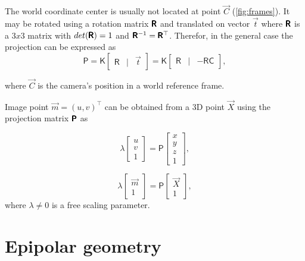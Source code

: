 The world coordinate center is usually not located at point $\vec{C}$ (\autoref{fig:frames}). 
It may be rotated using a rotation matrix $\pmb{\mathsf{R}}$ and translated on vector $\vec{t}$ where $\pmb{\mathsf{R}}$ is a $3x3$ matrix with $det(\pmb{\mathsf{R}}) = 1$ and $\pmb{\mathsf{R}}^{-1} = \pmb{\mathsf{R}}^\top$. 
Therefor, in the general case the projection can be expressed as
\begin{equation}
    \pmb{\mathsf{P}} = \pmb{\mathsf{K}} \begin{bmatrix} \pmb{\mathsf{R}} & | & \vec{t} \end{bmatrix} = 
    \pmb{\mathsf{K}} \begin{bmatrix} \pmb{\mathsf{R}} & | & - \pmb{\mathsf{R}} \pmb{\mathsf{C}} \end{bmatrix},
\end{equation}

where $\vec{C}$ is the camera's position in a world reference frame. 

Image point $\vec{m} = (u, v)^\top$ can be obtained from a 3D point $\vec{X}$ using the projection matrix $\pmb{\mathsf{P}}$ as

\begin{equation}
    \label{eq:projection}
    \lambda \begin{bmatrix} 
        u \\ v \\ 1 \end{bmatrix} = \pmb{\mathsf{P}} \begin{bmatrix} x \\ y \\ z \\ 1
    \end{bmatrix},
\end{equation}

\begin{equation}
    \lambda \begin{bmatrix} 
    \vec{m} \\ 1 \end{bmatrix} = \pmb{\mathsf{P}} \begin{bmatrix} \vec{X} \\ 1
\end{bmatrix},
\end{equation}
where $\lambda \neq 0$ is a free scaling parameter.

\section{Epipolar geometry}

